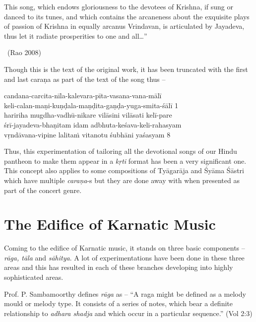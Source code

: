 \newpage

\begin{myquote}
This song, which endows gloriousness to the devotees of Krishna, if sung or danced to its tunes, and which contains the arcaneness about the exquisite plays of passion of Krishna in equally arcanus Vrindavan, is articulated by Jayadeva, thus let it radiate prosperities to one and all…” 

~\hfill (Rao 2008)
\end{myquote}

Though this is the text of the original work, it has been truncated with the first and last caraṇa as part of the text of the song thus –

\begin{myquote}
candana-carcita-nīla-kalevara-pīta-vasana-vana-mālī \\ keli-calan-maṇi-kuṇḍala-maṇḍita-gaṇḍa-yuga-smita-śālī  1 \\ haririha mugdha-vadhū-nikare vilāsini vilāsati kelī-pare\\ śrī-jayadeva-bhaṇitam idam adbhuta-keśava-keli-rahasyam  \\ vṛndāvana-vipine lalitaṁ vitanotu śubhāni yaśasyam  8 
\end{myquote}

Thus, this experimentation of tailoring all the devotional songs of our Hindu pantheon to make them appear in a \textit{kṛti} format has been a very significant one. This concept also applies to some compositions of Tyāgarāja and Śyāma Śāstri which have multiple \textit{caraṇa}-s but they are done away with when presented as part of the concert genre.

\vspace{-.3cm}

\section*{The Edifice of Karnatic Music}

Coming to the edifice of Karnatic music, it stands on three basic components – \textit{rāga, tāla} and \textit{sāhitya}. A lot of experimentations have been done in these three areas and this has resulted in each of these branches developing into highly sophisticated areas.

Prof. P. Sambamoorthy defines \textit{rāga} as – “A raga might be defined as a melody mould or melody type. It consists of a series of notes, which bear a definite relationship to \textit{adhara shadja} and which occur in a particular sequence.” (Vol 2:3)

